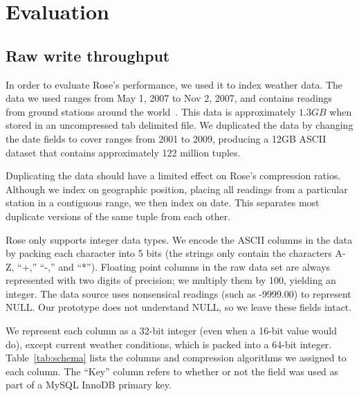 \documentclass{vldb}
\newcommand{\rows}{Rose\xspace}
\newcommand{\rowss}{Rose's\xspace}
\begin{document}
\section{Evaluation}

\subsection{Raw write throughput}

In order to evaluate \rowss performance, we used it to index
weather data.  The data we used ranges from May 1,
2007 to Nov 2, 2007, and contains readings from ground stations around
the world~\cite{nssl}.  This data is approximately $1.3GB$ when stored in an
uncompressed tab delimited file.  We duplicated the data by changing
the date fields to cover ranges from 2001 to 2009, producing a 12GB
ASCII dataset that contains approximately 122 million tuples.

Duplicating the data should have a limited effect on \rowss
compression ratios.  Although we index on geographic position, placing
all readings from a particular station in a contiguous range, we then
index on date.  This separates most duplicate versions of the same tuple
from each other.

\rows only supports integer data types.  We encode the ASCII columns
in the data by packing each character into 5 bits (the strings only
contain the characters A-Z, ``+,'' ``-,'' and ``*'').  Floating point columns in
the raw data set are always represented with two digits of precision;
we multiply them by 100, yielding an integer.  The data source uses
nonsensical readings (such as -9999.00) to represent NULL.  Our
prototype does not understand NULL, so we leave these fields intact.

We represent each column as a 32-bit integer (even when a 16-bit value
would do), except current weather conditions, which is packed into a
64-bit integer.  Table~\ref{tab:schema} lists the columns and
compression algorithms we assigned to each column.  The ``Key'' column refers
to whether or not the field was used as part of a MySQL InnoDB primary key.
\end{document}
